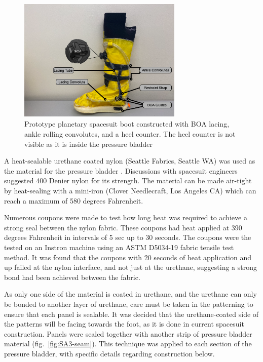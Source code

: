 \documentclass[defaultstyle,11pt]{comps}
\begin{document}
\begin{figure}
\hypertarget{fig:SA3-proto_boot}{%
\centering
\includegraphics[width=0.7\textwidth,height=\textheight]{../fig/SA3/Proto_Spaceboot.png}
\caption{Prototype planetary spacesuit boot constructed with BOA lacing, ankle rolling convolutes, and a heel counter. The heel counter is not visible as it is inside the pressure bladder}\label{fig:SA3-proto_boot}
}
\end{figure}

A heat-sealable urethane coated nylon (Seattle Fabrics, Seattle WA) was used as the material for the pressure bladder \citep{Harris2001}.
Discussions with spacesuit engineers suggested 400 Denier nylon for its strength. The material can be made air-tight by heat-sealing with a mini-iron (Clover Needlecraft, Los Angeles CA) which can reach a maximum of 580 degrees Fahrenheit.

Numerous coupons were made to test how long heat was required to achieve a strong seal between the nylon fabric.
These coupons had heat applied at 390 degrees Fahrenheit in intervals of 5 sec up to 30 seconds.
The coupons were the tested on an Instron machine using an ASTM D5034-19 fabric tensile test method.
It was found that the coupons with 20 seconds of heat application and up failed at the nylon interface, and not just at the urethane, suggesting a strong bond had been achieved between the fabric.

As only one side of the material is coated in urethane, and the urethane can only be bonded to another layer of urethane, care must be taken in the patterning to ensure that each panel is sealable.
It was decided that the urethane-coated side of the patterns will be facing towards the foot, as it is done in current spacesuit construction.
Panels were sealed together with another strip of pressure bladder material (fig.~\ref{fig:SA3-seam}).
This technique was applied to each section of the pressure bladder, with specific details regarding construction below.
\end{document}
